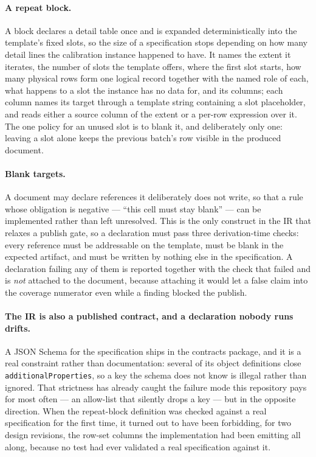 \paragraph{A repeat block.}
A block declares a detail table once and is expanded deterministically into the template's
fixed slots, so the size of a specification stops depending on how many detail lines the
calibration instance happened to have. It names the extent it iterates, the number of slots
the template offers, where the first slot starts, how many physical rows form one logical
record together with the named role of each, what happens to a slot the instance has no
data for, and its columns; each column names its target through a template string
containing a slot placeholder, and reads either a source column of the extent or a
per-row expression over it. The one policy for an unused slot is to blank it, and
deliberately only one: leaving a slot alone keeps the previous batch's row visible in the
produced document.

\paragraph{Blank targets.}
A document may declare references it deliberately does not write, so that a rule whose
obligation is negative --- ``this cell must stay blank'' --- can be implemented rather than
left unresolved. This is the only construct in the IR that relaxes a publish gate, so a
declaration must pass three derivation-time checks: every reference must be addressable on
the template, must be blank in the expected artifact, and must be written by nothing else in
the specification. A declaration failing any of them is reported together with the check
that failed and is \emph{not} attached to the document, because attaching it would let a
false claim into the coverage numerator even while a finding blocked the publish.

\paragraph{The IR is also a published contract, and a declaration nobody runs drifts.}
A JSON Schema for the specification ships in the contracts package, and it is a real
constraint rather than documentation: several of its object definitions close
\texttt{additionalProperties}, so a key the schema does not know is illegal rather than
ignored. That strictness has already caught the failure mode this repository pays for most
often --- an allow-list that silently drops a key --- but in the opposite direction. When
the repeat-block definition was checked against a real specification for the first time, it
turned out to have been forbidding, for two design revisions, the row-set columns the
implementation had been emitting all along, because no test had ever validated a real
specification against it.


